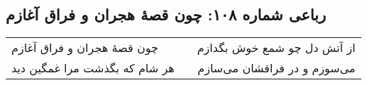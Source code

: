 \begin{center}
\section*{رباعی شماره ۱۰۸: چون قصهٔ هجران و فراق آغازم}
\label{sec:108}
\begin{longtable}{l p{0.5cm} r}
چون قصهٔ هجران و فراق آغازم
&&
از آتش دل چو شمع خوش بگدازم
\\
هر شام که بگذشت مرا غمگین دید
&&
می‌سوزم و در فراقشان می‌سازم
\\
\end{longtable}
\end{center}

